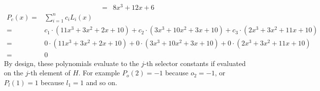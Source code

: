 \begin{example}
$$\begin{array}{rl}
         = & 8x^3 + 12x + 6              
\end{array}
$$
$$
\begin{array}{rl}
P_{c}(x) = & \sum_{i=1}^{n} {c_i}L_i(x)\\         
         = & c_1\cdot(11x^3 +3x^2 +2x + 10) + c_2\cdot (3x^3 +10x^2+ 3x + 10) + c_3\cdot (2x^3 + 3x^2 +11x +10) \\
         = & 0\cdot(11x^3 +3x^2 +2x + 10) + 0\cdot (3x^3 +10x^2+ 3x + 10) + 0\cdot (2x^3 + 3x^2 +11x +10) \\
         = & 0          
\end{array}
$$
By design, these polynomials evaluate to the $j$-th selector constants if evaluated on the $j$-th element of $H$. For example $P_o(2)=-1$ because $o_2=-1$, or $P_l(1)=1$ because $l_1=1$ and so on. 


\end{example}
